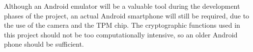 Although an Android emulator will be a valuable tool during the development phases of the project, an actual Android smartphone will still be required, due to the use of the camera and the TPM chip. The cryptographic functions used in this project should not be too computationally intensive, so an older Android phone should be sufficient.
